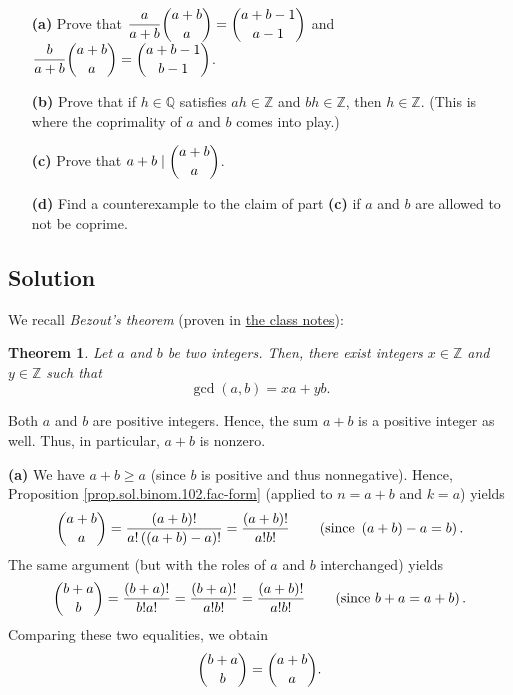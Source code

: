 \documentclass[paper=a4, fontsize=12pt]{scrartcl}%
\theoremstyle{plainsl}
\newtheorem{theorem}{Theorem}[section]
\theoremstyle{definition}
\theoremstyle{remark}
\begin{document}
\begin{enumerate}
\item[\textbf{(a)}] Prove that $\dfrac{a}{a+b} \dbinom{a+b}{a} =
\dbinom{a+b-1}{a-1}$ and $\dfrac{b}{a+b} \dbinom{a+b}{a} = \dbinom{a+b-1}%
{b-1}$.

\item[\textbf{(b)}] Prove that if $h \in\mathbb{Q}$ satisfies $ah
\in\mathbb{Z}$ and $bh \in\mathbb{Z}$, then $h \in\mathbb{Z}$. (This is where
the coprimality of $a$ and $b$ comes into play.)

\item[\textbf{(c)}] Prove that $a+b \mid\dbinom{a+b}{a}$.

\item[\textbf{(d)}] Find a counterexample to the claim of part \textbf{(c)} if
$a$ and $b$ are allowed to not be coprime.
\end{enumerate}

\subsection{Solution}

We recall \textit{Bezout's theorem} (proven in
\href{http://www.cip.ifi.lmu.de/~grinberg/t/19s/notes.pdf}{the class notes}):

\begin{theorem}
\label{thm.ent.gcd.bezout}Let $a$ and $b$ be two integers. Then, there exist
integers $x\in\mathbb{Z}$ and $y\in\mathbb{Z}$ such that%
\[
\gcd\left(  a,b\right)  =xa+yb.
\]

\end{theorem}

Both $a$ and $b$ are positive integers. Hence, the sum $a+b$ is a positive
integer as well. Thus, in particular, $a+b$ is nonzero.

\textbf{(a)} We have $a+b\geq a$ (since $b$ is positive and thus nonnegative).
Hence, Proposition \ref{prop.sol.binom.102.fac-form} (applied to $n=a+b$ and
$k=a$) yields
\[
\dbinom{a+b}{a}=\dfrac{\left(  a+b\right)  !}{a!\left(  \left(  a+b\right)
-a\right)  !}=\dfrac{\left(  a+b\right)  !}{a!b!}\qquad\left(  \text{since
}\left(  a+b\right)  -a=b\right)  .
\]
The same argument (but with the roles of $a$ and $b$ interchanged) yields
\[
\dbinom{b+a}{b}=\dfrac{\left(  b+a\right)  !}{b!a!}=\dfrac{\left(  b+a\right)
!}{a!b!}=\dfrac{\left(  a+b\right)  !}{a!b!}\qquad\left(  \text{since
}b+a=a+b\right)  .
\]
Comparing these two equalities, we obtain%
\begin{equation}
\dbinom{b+a}{b}=\dbinom{a+b}{a}. \label{sol.binom.coprime-rat-cat-1.symm}%
\end{equation}
\end{document}
